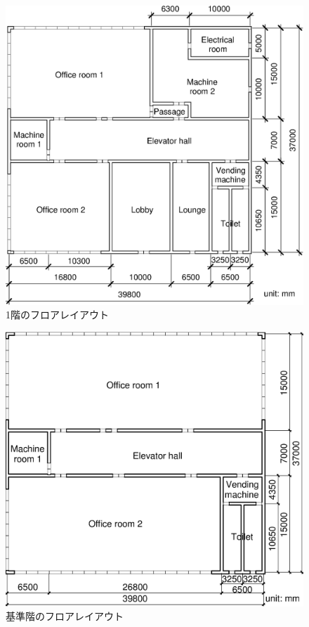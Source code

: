 \begin{figure}[htbp]
  \begin{center}
    \includegraphics[width=0.65\linewidth]{fig/sim_groundfloor_en.eps}
  \end{center}
  \caption{1階のフロアレイアウト}
  \label{fig::sim_groundfloor}
\end{figure}
\begin{figure}[ht]
  \begin{center}
    \includegraphics[width=0.65\linewidth]{fig/sim_typicalfloor_en.eps}
  \end{center}
  \caption{基準階のフロアレイアウト}
  \label{fig::sim_typicalfloor}
\end{figure}


